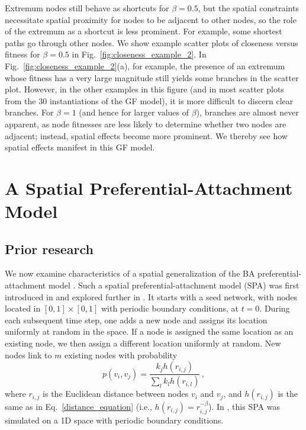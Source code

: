 \documentclass[%
 reprint,
 amsmath,amssymb,
 aps,
]{revtex4-1}
\begin{document}
Extremum nodes still behave as shortcuts for $\beta = 0.5$, but the spatial constraints necessitate spatial proximity for nodes to be adjacent to other nodes, so the role of the extremum as a shortcut is less prominent.
For example, some shortest paths go through other nodes. We show example scatter plots of closeness versus fitness for $\beta = 0.5$ in Fig.~\ref{fig:closeness_example_2}. In Fig.~\ref{fig:closeness_example_2}(a), for example, the presence of an extremum whose fitness has a very large magnitude still yields some branches in the scatter plot. However, in the other examples in this figure (and in most scatter plots from the $30$ instantiations of the GF model), it is more difficult to discern clear branches. For $\beta = 1$ (and hence for larger values of $\beta$), branches are almost never apparent, as node fitnesses are less likely to determine whether two nodes are adjacent; instead, spatial effects become more prominent. We thereby see how spatial effects manifest in this GF
model.
 
 


\section{A Spatial Preferential-Attachment Model} \label{sec:ba-model}

\subsection{Prior research} \label{prior}


We now examine characteristics of a spatial generalization of the BA preferential-attachment model \cite{BA}. Such a spatial preferential-attachment model (SPA) was first introduced in \cite{SPA1} and explored further in \cite{SPA2, SPA3, SPA4}. It starts with a seed network, with nodes located in $[0, 1] \times [0, 1]$ {\color{red}with periodic boundary conditions},
 at $t=0$. During each subsequent time step, one adds a new node and assigns its location uniformly at random in the space. If a node is assigned the same location as an existing node, we then assign a different location uniformly at random. New nodes link to $m$ existing nodes with probability 
\begin{equation}\label{spatialpreferential_prior}
    p(v_i,v_j) = \frac{k_j h(r_{i, j})}{\sum_l k_l h(r_{i,l})}\,,
\end{equation}
where $r_{i,j}$ is the Euclidean distance between nodes $v_i$ and $v_j$, and $h(r_{i,j})$ is the same as in Eq.~\eqref{distance_equation} (i.e., $h(r_{i,j}) = r_{i,j}^{-\beta}$). In \cite{SPA1}, this SPA was simulated on a 1D space {\color{red}with periodic boundary conditions}. 
\end{document}
